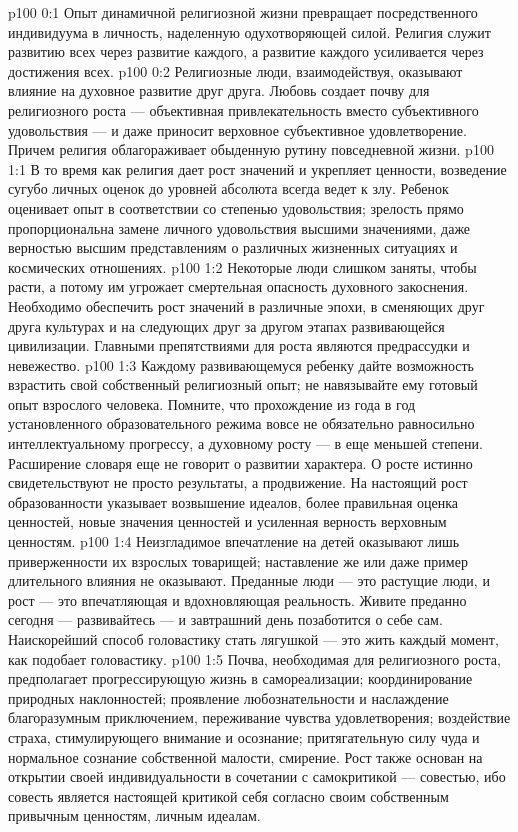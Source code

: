 \author{Мелхиседек}
\vs p100 0:1 Опыт динамичной религиозной жизни превращает посредственного индивидуума в личность, наделенную одухотворяющей силой. Религия служит развитию всех через развитие каждого, а развитие каждого усиливается через достижения всех.
\vs p100 0:2 Религиозные люди, взаимодействуя, оказывают влияние на духовное развитие друг друга. Любовь создает почву для религиозного роста --- объективная привлекательность вместо субъективного удовольствия --- и даже приносит верховное субъективное удовлетворение. Причем религия облагораживает обыденную рутину повседневной жизни.
\vs p100 1:1 В то время как религия дает рост значений и укрепляет ценности, возведение сугубо личных оценок до уровней абсолюта всегда ведет к злу. Ребенок оценивает опыт в соответствии со степенью удовольствия; зрелость прямо пропорциональна замене личного удовольствия высшими значениями, даже верностью высшим представлениям о различных жизненных ситуациях и космических отношениях.
\vs p100 1:2 Некоторые люди слишком заняты, чтобы расти, а потому им угрожает смертельная опасность духовного закоснения. Необходимо обеспечить рост значений в различные эпохи, в сменяющих друг друга культурах и на следующих друг за другом этапах развивающейся цивилизации. Главными препятствиями для роста являются предрассудки и невежество.
\vs p100 1:3 Каждому развивающемуся ребенку дайте возможность взрастить свой собственный религиозный опыт; не навязывайте ему готовый опыт взрослого человека. Помните, что прохождение из года в год установленного образовательного режима вовсе не обязательно равносильно интеллектуальному прогрессу, а духовному росту --- в еще меньшей степени. Расширение словаря еще не говорит о развитии характера. О росте истинно свидетельствуют не просто результаты, а продвижение. На настоящий рост образованности указывает возвышение идеалов, более правильная оценка ценностей, новые значения ценностей и усиленная верность верховным ценностям.
\vs p100 1:4 Неизгладимое впечатление на детей оказывают лишь приверженности их взрослых товарищей; наставление же или даже пример длительного влияния не оказывают. Преданные люди --- это растущие люди, и рост --- это впечатляющая и вдохновляющая реальность. Живите преданно сегодня --- развивайтесь --- и завтрашний день позаботится о себе сам. Наискорейший способ головастику стать лягушкой --- это жить каждый момент, как подобает головастику.
\vs p100 1:5 \pc Почва, необходимая для религиозного роста, предполагает прогрессирующую жизнь в самореализации; координирование природных наклонностей; проявление любознательности и наслаждение благоразумным приключением, переживание чувства удовлетворения; воздействие страха, стимулирующего внимание и осознание; притягательную силу чуда и нормальное сознание собственной малости, смирение. Рост также основан на открытии своей индивидуальности в сочетании с самокритикой --- совестью, ибо совесть является настоящей критикой себя согласно своим собственным привычным ценностям, личным идеалам.
